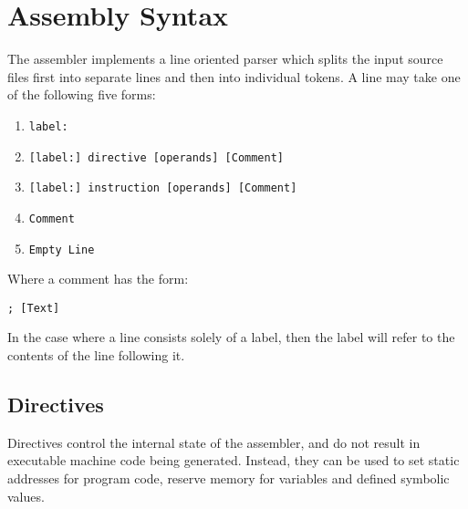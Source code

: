 \documentclass[12pt,twoside]{report}
\begin{document}
\chapter{Assembly Syntax}

The assembler implements a line oriented parser which splits the input
source files first into separate lines and then into individual
tokens. A line may take one of the following five forms:

\begin{enumerate}
\item \texttt{label:}
\item \texttt{[label:] directive [operands] [Comment]}
\item \texttt{[label:] instruction [operands] [Comment]}
\item \texttt{Comment}
\item \texttt{Empty Line}
\end{enumerate}

\noindent
Where a comment has the form:

\begin{verbatim}
; [Text]
\end{verbatim}

\noindent
In the case where a line consists solely of a label, then the label
will refer to the contents of the line following it.

\section{Directives}

Directives control the internal state of the assembler, and do not
result in executable machine code being generated. Instead, they can
be used to set static addresses for program code, reserve memory for
variables and defined symbolic values.
\end{document}
